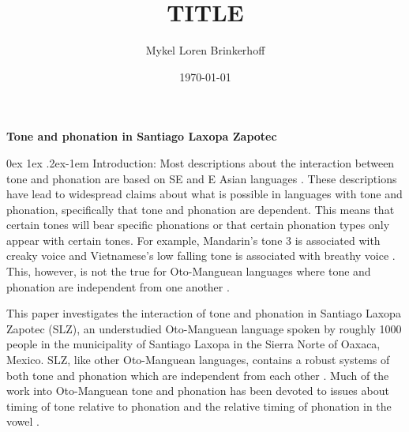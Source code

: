 \documentclass[12pt, letterpaper]{article}
\title{TITLE}
\author{Mykel Loren Brinkerhoff}
\date{\today}
\makeatletter
\renewcommand{\paragraph}{%
  \@startsection{paragraph}{4}%
  {\z@}{0ex \@plus 1ex \@minus .2ex}{-1em}%
  {\normalfont\normalsize\bfseries}%
}
\makeatother
\begin{document}
	

	
	
\begin{center}
	\textbf{Tone and phonation in Santiago Laxopa Zapotec}
\end{center}
\thispagestyle{empty}

\paragraph{Introduction:}
Most descriptions about the interaction between tone and phonation are based on SE and E Asian languages \citep{masicaDefiningLinguisticArea1976,thurgoodVietnameseTonogenesisRevising2002,yipTone2002,enfieldArealLinguisticsMainland2005,michaudComplexTonesEast2012,brunelleTonePhonationSoutheast2016}.
These descriptions have lead to widespread claims about what is possible in languages with tone and phonation, specifically that tone and phonation are dependent. 
This means that certain tones will bear specific phonations or that certain phonation types only appear with certain tones. 
For example, Mandarin's tone 3 is associated with creaky voice \citep{duanmuPhonologyStandardChinese2007} and Vietnamese's low falling tone is associated with breathy voice \citep{thurgoodVietnameseTonogenesisRevising2002}.
This, however, is not the true for Oto-Manguean languages where tone and phonation are independent from one another \citep{silvermanLaryngealComplexityOtomanguean1997}.

This paper investigates the interaction of tone and phonation in Santiago Laxopa Zapotec (SLZ), an understudied Oto-Manguean language spoken by roughly 1000 people in the municipality of Santiago Laxopa in the Sierra Norte of Oaxaca, Mexico.
SLZ, like other Oto-Manguean languages, contains a robust systems of both tone and phonation which are independent from each other \citep{silvermanLaryngealComplexityOtomanguean1997}.
Much of the work into Oto-Manguean tone and phonation has been devoted to issues about timing of tone relative to phonation and the relative timing of phonation in the vowel \citep{silvermanLaryngealComplexityOtomanguean1997,blankenshipTimingNonmodalPhonation2002}.
\end{document}
